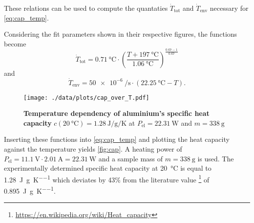These relations can be used to compute the quantaties $\dot{T}_\text{tot}$ and $\dot{T}_\text{env}$ necessary for \autoref{eq:cap_temp}.

Considering the fit parameters shown in their respective figures, the functions become
\begin{equation*}
	\dot{T}_\text{tot} = \SI{0.71}{\celsius}\cdot\left(\frac{T+\SI{197}{\celsius}}{\SI{1.06}{\celsius}}\right)^{\frac{0.67-1}{0.67}}
\end{equation*}
and
\begin{equation*}
	\dot{T}_\text{env} = \SI{50e-6}{\per\second}\cdot(\SI{22.25}{\celsius}-T).
\end{equation*}

\begin{figure}[tbp]
	\centering
	\texttt{[image: ./data/plots/cap\_over\_T.pdf]}
	\caption[Temperature dependency of aluminium's specific heat capacity]{\textbf{Temperature dependency of aluminium's specific heat capacity} $c(\SI{20}{\celsius})=\SI{1.28}{\joule\per\gram\per\kelvin}$ at $P_\text{el}=\SI{22.31}{\watt}$ and $m=\SI{338}{\gram}$}
	\label{fig:cap}
\end{figure}
Inserting these functions into \autoref{eq:cap_temp} and plotting the heat capacity against the temperature yields \autoref{fig:cap}.
A heating power of $P_\text{el}=\SI{11.1}{\volt}\cdot\SI{2.01}{\ampere} = \SI{22.31}{\watt}$ and a sample mass of $m=\SI{338}{\gram}$ is used.
The experimentally determined specific heat capacity at \SI{20}{\celsius} is equal to \SI{1.28}{\joule\per\gram\per\kelvin} which deviates by \num{43}\% from the literature value \footnote{\url{https://en.wikipedia.org/wiki/Heat_capacity}} of \SI{0.895}{\joule\per\gram\per\kelvin}.
